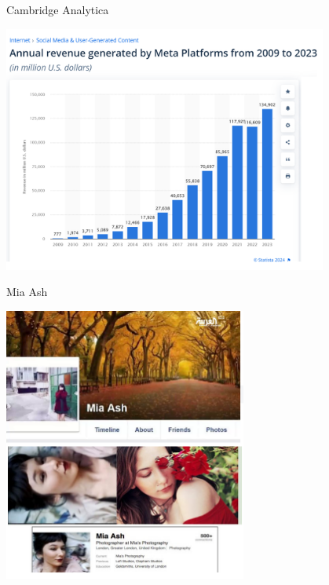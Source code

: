 \documentclass[11pt]{beamer}
\begin{document}
\begin{frame}{Cambridge Analytica \cite{CA_rev}}

\begin{center}
\includegraphics[width=0.8\textwidth]{Pic/FB_REV.png}
\end{center}

\end{frame}

\begin{frame}{Mia Ash}

\begin{center}
\includegraphics[width=0.6\textwidth]{Pic/mia_ASH.png}
\end{center}

\end{frame}
\end{document}

